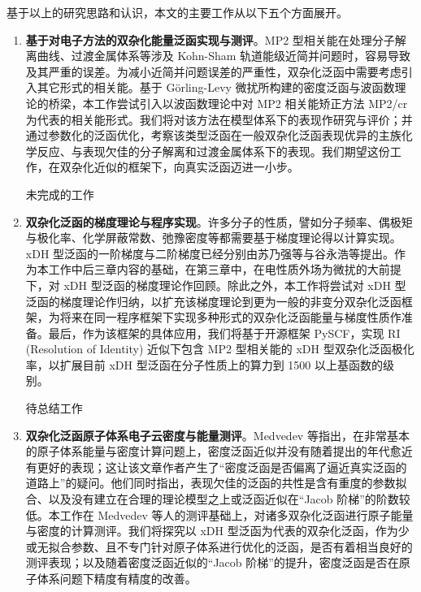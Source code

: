 基于以上的研究思路和认识，本文的主要工作从以下五个方面展开。
\begin{enumerate}[nosep]
  \item \textbf{基于对电子方法的双杂化能量泛函实现与测评}。MP2 型相关能在处理分子解离曲线、过渡金属体系等涉及 Kohn-Sham 轨道能级近简并问题时，容易导致及其严重的误差。为减小近简并问题误差的严重性，双杂化泛函中需要考虑引入其它形式的相关能。基于 G\"orling-Levy 微扰所构建的密度泛函与波函数理论的桥梁，本工作尝试引入以波函数理论中对 MP2 相关能矫正方法 MP2/cr\cite{Dykstra-Davidson.IJQC.2000} 为代表的相关能形式。我们将对该方法在模型体系下的表现作研究与评价；并通过参数化的泛函优化，考察该类型泛函在一般双杂化泛函表现优异的主族化学反应、与表现欠佳的分子解离和过渡金属体系下的表现。我们期望这份工作，在双杂化近似的框架下，向真实泛函迈进一小步。
  
  \alert{未完成的工作}

  \item \textbf{双杂化泛函的梯度理论与程序实现}。许多分子的性质，譬如分子频率、偶极矩与极化率、化学屏蔽常数、弛豫密度等都需要基于梯度理论得以计算实现。xDH 型泛函的一阶梯度与二阶梯度已经分别由苏乃强等\cite{Su-Xu.SCC.2013}与谷永浩等\cite{Gu-Xu.JCTC.2021}提出。作为本工作中后三章内容的基础，在第三章中，在电性质外场为微扰的大前提下，对 xDH 型泛函的梯度理论作回顾。除此之外，本工作将尝试对 xDH 型泛函的梯度理论作归纳，以扩充该梯度理论到更为一般的非变分双杂化泛函框架，为将来在同一程序框架下实现多种形式的双杂化泛函能量与梯度性质作准备。最后，作为该框架的具体应用，我们将基于开源框架 PySCF\cite{Sun-Chan.WCMS.2018, Sun-Chan.JCP.2020}，实现 RI (Resolution of Identity) 近似下包含 MP2 型相关能的 xDH 型双杂化泛函极化率，以扩展目前 xDH 型泛函在分子性质上的算力到 1500 以上基函数的级别。
  
  \alert{待总结工作}
  
  \item \textbf{双杂化泛函原子体系电子云密度与能量测评}。Medvedev 等指出，在非常基本的原子体系能量与密度计算问题上，密度泛函近似并没有随着提出的年代愈近有更好的表现\cite{Medvedev-Lyssenko.S.2017}；这让该文章作者产生了“密度泛函是否偏离了逼近真实泛函的道路上”的疑问。他们同时指出，表现欠佳的泛函的共性是含有重度的参数拟合、以及没有建立在合理的理论模型之上或泛函近似在“Jacob 阶梯”的阶数较低。本工作在 Medvedev 等人的测评基础上，对诸多双杂化泛函进行原子能量与密度的计算测评。我们将探究以 xDH 型泛函为代表的双杂化泛函，作为少或无拟合参数、且不专门针对原子体系进行优化的泛函，是否有着相当良好的测评表现；以及随着密度泛函近似的“Jacob 阶梯”的提升，密度泛函是否在原子体系问题下精度有精度的改善。
  

\end{enumerate}
